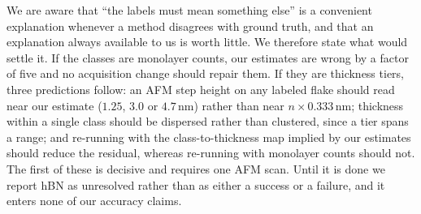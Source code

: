 \documentclass[10pt]{article}
\begin{document}
We are aware that ``the labels must mean something else'' is a convenient explanation whenever a method disagrees with ground truth, and that an explanation always available to us is worth little. We therefore state what would settle it. If the classes are monolayer counts, our estimates are wrong by a factor of five and no acquisition change should repair them. If they are thickness tiers, three predictions follow: an AFM step height on any labeled flake should read near our estimate ($1.25$, $3.0$ or $4.7$\,nm) rather than near $n\times0.333$\,nm; thickness within a single class should be dispersed rather than clustered, since a tier spans a range; and re-running with the class-to-thickness map implied by our estimates should reduce the residual, whereas re-running with monolayer counts should not. The first of these is decisive and requires one AFM scan. Until it is done we report hBN as unresolved rather than as either a success or a failure, and it enters none of our accuracy claims.
\end{document}
